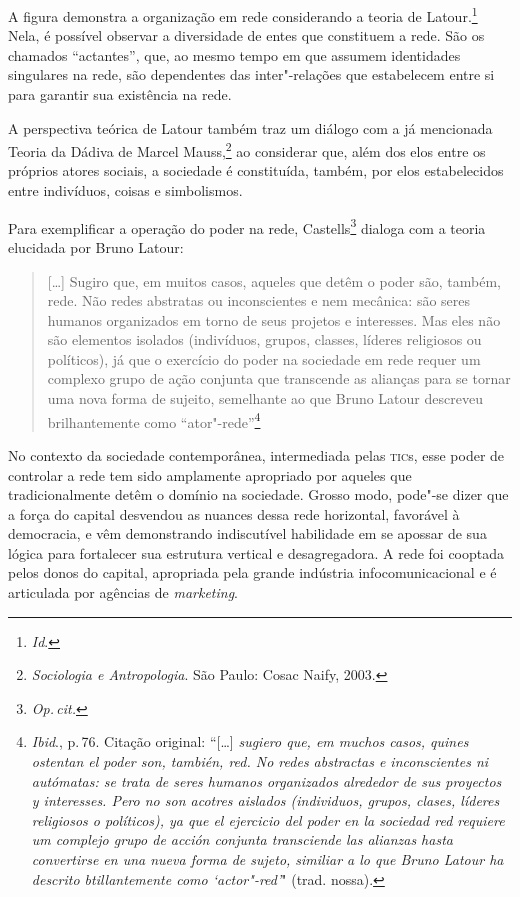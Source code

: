 
A figura demonstra a organização em rede considerando a teoria de
Latour.\footnote{\textit{Id}.} Nela, é possível observar a diversidade de entes que
constituem a rede. São os chamados ``actantes'', que, ao mesmo tempo em
que assumem identidades singulares na rede, são dependentes das
inter"-relações que estabelecem entre si para garantir sua existência na
rede.

A perspectiva teórica de Latour também traz um diálogo com a já
mencionada Teoria da Dádiva de Marcel Mauss,\footnote{\emph{Sociologia e Antropologia}. São Paulo: Cosac Naify, 2003.} ao considerar que,
além dos elos entre os próprios atores sociais, a sociedade é
constituída, também, por elos estabelecidos entre indivíduos, coisas e
simbolismos.

Para exemplificar a operação do poder na rede, Castells\footnote{\textit{Op.\,cit.}} dialoga
com a teoria elucidada por Bruno Latour:

\begin{quote}
{[}\ldots{}{]} Sugiro que, em muitos casos, aqueles que detêm o poder são,
também, rede. Não redes abstratas ou inconscientes e nem mecânica: são
seres humanos organizados em torno de seus projetos e interesses. Mas
eles não são elementos isolados (indivíduos, grupos, classes, líderes
religiosos ou políticos), já que o exercício do poder na sociedade em
rede requer um complexo grupo de ação conjunta que transcende as
alianças para se tornar uma nova forma de sujeito, semelhante ao que
Bruno Latour descreveu brilhantemente como ``ator"-rede''\footnote{\textit{Ibid}., p.\,76. Citação
  original: ``{[}\ldots{}{]} \emph{sugiero que, em muchos casos, quines ostentan el
        poder son, también, red. No redes abstractas e inconscientes ni
        autómatas: se trata de seres humanos organizados alrededor de sus
        proyectos y interesses. Pero no son acotres aislados (individuos,
        grupos, clases, líderes religiosos o políticos), ya que el ejercicio
        del poder en la sociedad red requiere um complejo grupo de acción
        conjunta transciende las alianzas hasta convertirse en una nueva forma
        de sujeto, similiar a lo que Bruno Latour ha descrito btillantemente
        como `actor"-red'}" (trad. nossa).}
\end{quote}

No contexto da sociedade contemporânea, intermediada pelas \textsc{tic}s, esse
poder de controlar a rede tem sido amplamente apropriado por aqueles que
tradicionalmente detêm o domínio na sociedade. Grosso modo, pode"-se
dizer que a força do capital desvendou as nuances dessa rede horizontal,
favorável à democracia, e vêm demonstrando indiscutível habilidade em se
apossar de sua lógica para fortalecer sua estrutura vertical e
desagregadora. A rede foi cooptada pelos donos do capital, apropriada
pela grande indústria infocomunicacional e é articulada por agências de
\emph{marketing}.

